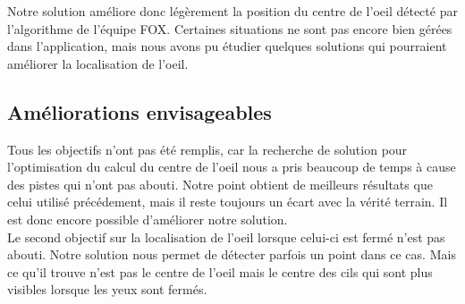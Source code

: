 Notre solution améliore donc légèrement la position du centre de l'oeil détecté par l'algorithme de l'équipe FOX. Certaines
situations ne sont pas encore bien gérées dans l'application, mais nous avons pu étudier quelques solutions qui pourraient améliorer
la localisation de l'oeil.

\subsection{Améliorations envisageables}
Tous les objectifs n'ont pas été remplis, car la recherche de solution pour l'optimisation du calcul du centre de l'oeil
nous a pris beaucoup de temps à cause des pistes qui n'ont pas abouti. Notre point obtient de meilleurs résultats
que celui utilisé précédement, mais il reste toujours un écart avec la vérité terrain. Il est donc encore possible
d'améliorer notre solution.\\

Le second objectif sur la localisation de l'oeil lorsque celui-ci est fermé n'est pas abouti. Notre solution
nous permet de détecter parfois un point dans ce cas. Mais ce qu'il trouve n'est pas le centre de l'oeil mais le
centre des cils qui sont plus visibles lorsque les yeux sont fermés.